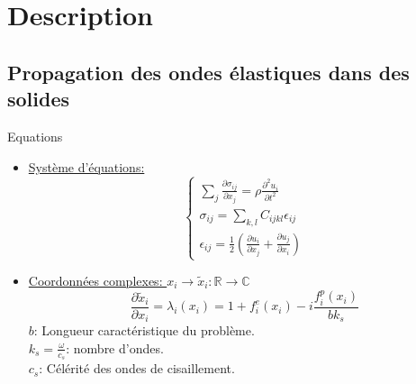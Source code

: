 \section{Description}
\subsection{Propagation des ondes élastiques dans des solides}
\begin{frame}{Equations}
\begin{itemize}
\item \underline{Système d'équations:}
\begin{equation}
\begin{cases}
\sum_{j}\frac{\partial \sigma_{ij}}{\partial x_j} = \rho \frac{\partial^2 u_i}{\partial t^2} \\
\sigma_{ij} = \sum_{k,l} C_{ijkl} \epsilon_{ij} \\
\epsilon_{ij} = \frac{1}{2}\left(\frac{\partial u_i}{\partial x_j} + \frac{\partial u_j}{\partial x_i} \right)
\end{cases}
\end{equation}
\item \underline{Coordonnées complexes: $x_i \rightarrow \tilde{x}_i: \mathbb{R} \rightarrow \mathbb{C}$}
\begin{equation}
\frac{\partial \tilde{x}_i}{\partial x_i} = \lambda_i(x_i) = 1+f_i^e(x_i)-i \frac{f^p_i(x_i)}{b k_s}
\end{equation}
$b$: Longueur caractéristique du problème.\\
$k_s = \frac{\omega}{c_s}$: nombre d'ondes.\\
$c_s$: Célérité des ondes de cisaillement.
 \end{itemize}
\end{frame}

